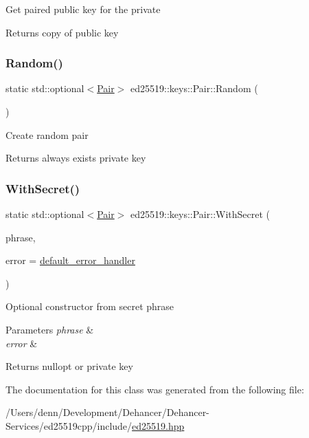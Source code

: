 Get paired public key for the private \begin{DoxyReturn}{Returns}
copy of public key 
\end{DoxyReturn}
\mbox{\label{classed25519_1_1keys_1_1_pair_a56deb8f1bf6d1a51313abebd5a41d6fc}} 
\subsubsection{\texorpdfstring{Random()}{Random()}}
{\footnotesize\ttfamily static std\+::optional$<$\mbox{\hyperlink{classed25519_1_1keys_1_1_pair}{Pair}}$>$ ed25519\+::keys\+::\+Pair\+::\+Random (\begin{DoxyParamCaption}{ }\end{DoxyParamCaption})\hspace{0.3cm}{\ttfamily [static]}}

Create random pair \begin{DoxyReturn}{Returns}
always exists private key 
\end{DoxyReturn}
\mbox{\label{classed25519_1_1keys_1_1_pair_a3d7457b834d7e8091a61272f20132d01}} 
\subsubsection{\texorpdfstring{With\+Secret()}{WithSecret()}}
{\footnotesize\ttfamily static std\+::optional$<$\mbox{\hyperlink{classed25519_1_1keys_1_1_pair}{Pair}}$>$ ed25519\+::keys\+::\+Pair\+::\+With\+Secret (\begin{DoxyParamCaption}\item[{const std\+::string \&}]{phrase,  }\item[{const \mbox{\hyperlink{namespaceed25519_a6ba572942b3c18591fc869d52a6b16e6}{Error\+Handler}} \&}]{error = {\ttfamily \mbox{\hyperlink{namespaceed25519_a7c7bb6ed17541162959c33ed3e3b15fb}{default\+\_\+error\+\_\+handler}}} }\end{DoxyParamCaption})\hspace{0.3cm}{\ttfamily [static]}}

Optional constructor from secret phrase 
\begin{DoxyParams}{Parameters}
{\em phrase} & \\
\hline
{\em error} & \\
\hline
\end{DoxyParams}
\begin{DoxyReturn}{Returns}
nullopt or private key 
\end{DoxyReturn}


The documentation for this class was generated from the following file\+:\begin{DoxyCompactItemize}
\item 
/\+Users/denn/\+Development/\+Dehancer/\+Dehancer-\/\+Services/ed25519cpp/include/\mbox{\hyperlink{ed25519_8hpp}{ed25519.\+hpp}}\end{DoxyCompactItemize}
